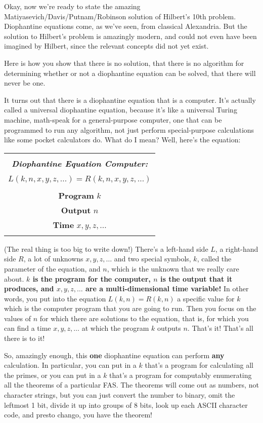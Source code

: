 \documentclass[12pt]{book}
\begin{document}
Okay, now we're ready to state the amazing Matiyasevich/Davis/Put\-nam/Robinson
solution of Hilbert's 10th problem. Diophantine equations come, as we've seen,
from classical Alexandria.  But the solution to Hilbert's problem
is amazingly modern, and could not even have been imagined by Hilbert, since 
the relevant concepts did not yet exist.
 
Here is how you show that there is no solution, that there is no algorithm for
determining whether or not a diophantine equation can be solved, that there will
never be one.
 
It turns out that there is a diophantine equation that is a computer.
It's actually called a universal diophantine equation, because it's like
a universal Turing machine, math-speak for a general-purpose computer, one
that can be programmed to run any algorithm, not just perform special-purpose calculations
like some pocket calculators do.
What do I mean?
Well, here's the equation:
\begin{center}
\begin{tabular}{|c|}
\hline
\\
\textbf{\emph{\large Diophantine Equation Computer:}}
\\
\\
$L(k, n, x, y, z, \ldots) = R(k, n, x, y, z, \ldots)$
\\
\\
\textbf{Program} $k$
\\
\textbf{Output} $n$
\\
\textbf{Time} $x, y, z, \ldots$
\\
\\
\hline
\end{tabular}
\end{center}
(The real thing is too big to write down!)
There's a left-hand side $L$, a right-hand side $R$, a lot of unknowns $x, y, z, \ldots$ and
two special symbols, $k$, called the parameter of the equation, and $n$, which is the unknown
that we really care about. \textbf{$k$ is the program for the computer, $n$ is the output that it
produces, and $x, y, z, \ldots$ are a multi-dimensional time variable!}  In other words,
you put into the equation $L(k, n) = R(k, n)$ a specific value for $k$ which is the computer
program that you are going to run.  Then you focus on the values of $n$ for which there are
solutions to the equation, that is, for which you can find a time $x, y, z, \ldots$ at which the
program $k$ outputs $n$.
That's it! That's all there is to it!
 
So, amazingly enough, this \textbf{one} diophantine equation can perform \textbf{any} calculation.
In particular, you can put in a $k$ that's a program for calculating all the primes, or you
can put in a $k$ that's a program for computably enumerating all the theorems of a particular FAS.
The theorems will come out as numbers, not character strings, but you can just convert the
number to binary, omit the leftmost 1 bit, divide it up into groups of 8 bits, look up each
ASCII character code, and presto chango, you have the theorem!
 
\end{document}
